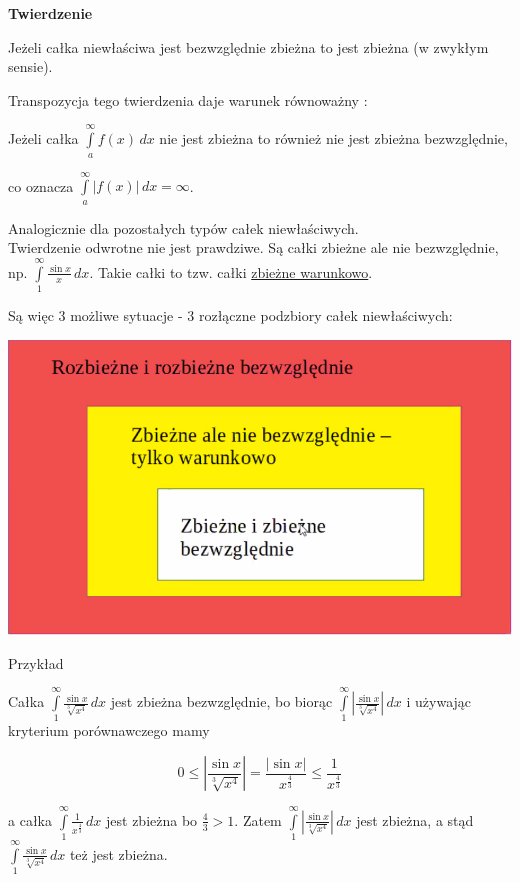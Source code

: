 \textbf{Twierdzenie}

Jeżeli całka niewłaściwa jest bezwzględnie zbieżna to jest zbieżna (w zwykłym sensie).

Transpozycja tego twierdzenia daje warunek równoważny : 

Jeżeli całka $ \int\limits_{a}^{\infty} f(x) \,dx $ nie jest zbieżna to również nie jest zbieżna bezwzględnie,

co oznacza $ \int\limits_{a}^{\infty} |f(x)| \,dx = \infty $.

Analogicznie dla pozostałych typów całek niewłaściwych. \\

Twierdzenie odwrotne nie jest prawdziwe. Są całki zbieżne ale nie bezwzględnie, np. $ \int\limits_{1}^{\infty} \frac{\sin x}{x} \,dx $.
Takie całki to tzw. całki \underline{zbieżne warunkowo}.

Są więc 3 możliwe sytuacje - 3 rozłączne podzbiory całek niewłaściwych:

\begin{center}
\includegraphics[scale=0.6]{rozbiezneirozbiezne.png}
\end{center}

Przykład 

Całka $ \int\limits_{1}^{\infty} \frac{\sin x}{\sqrt[3]{x^4}} \,dx $ jest zbieżna bezwzględnie, bo biorąc
$ \int\limits_{1}^{\infty} \left| \frac{\sin x}{\sqrt[3]{x^4}} \right| \,dx $ i używając kryterium porównawczego mamy

$$ 0 \leq \left| \frac{\sin x}{\sqrt[3]{x^4}} \right| = \frac{|\sin x|}{x^{\frac{4}{3}}} \leq \frac{1}{x^{\frac{4}{3}}} $$

a całka $ \int\limits_{1}^{\infty} \frac{1}{x^{\frac{4}{3}}} \,dx $ jest zbieżna bo $ \frac{4}{3} > 1 $.
Zatem $ \int\limits_{1}^{\infty} \left| \frac{\sin x}{\sqrt[3]{x^4}} \right| \,dx $ jest zbieżna, a stąd
$ \int\limits_{1}^{\infty} \frac{\sin x}{\sqrt[3]{x^4}} \,dx $ też jest zbieżna.